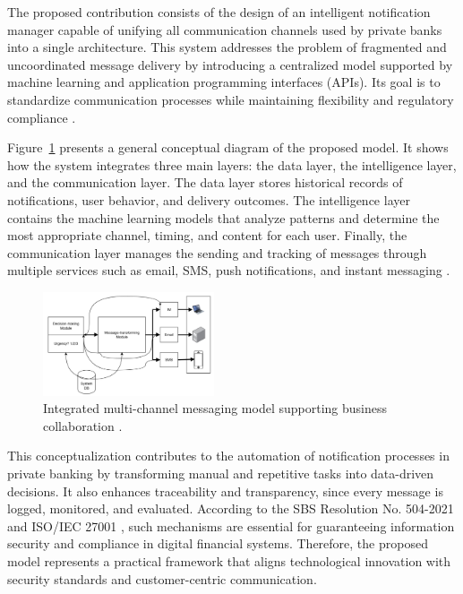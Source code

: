 \documentclass[conference]{IEEEtran}
\begin{document}
The proposed contribution consists of the design of an intelligent notification manager capable of unifying all communication channels used by private banks into a single architecture. This system addresses the problem of fragmented and uncoordinated message delivery by introducing a centralized model supported by machine learning and application programming interfaces (APIs). Its goal is to standardize communication processes while maintaining flexibility and regulatory compliance \cite{rahimi2021,torres2020}.

Figure~\ref{fig:liu2011} presents a general conceptual diagram of the proposed model. It shows how the system integrates three main layers: the data layer, the intelligence layer, and the communication layer. The data layer stores historical records of notifications, user behavior, and delivery outcomes. The intelligence layer contains the machine learning models that analyze patterns and determine the most appropriate channel, timing, and content for each user. Finally, the communication layer manages the sending and tracking of messages through multiple services such as email, SMS, push notifications, and instant messaging \cite{liang2011}.

\begin{figure}[htbp]
  \centering
  \includegraphics[width=0.45\textwidth]{liu2011-model.jpg}
  \caption{Integrated multi-channel messaging model supporting business collaboration \cite{liu2011}.}
  \label{fig:liu2011}
\end{figure}

This conceptualization contributes to the automation of notification processes in private banking by transforming manual and repetitive tasks into data-driven decisions. It also enhances traceability and transparency, since every message is logged, monitored, and evaluated. According to the SBS Resolution No. 504-2021 \cite{sbs2021} and ISO/IEC 27001 \cite{iso27001}, such mechanisms are essential for guaranteeing information security and compliance in digital financial systems. Therefore, the proposed model represents a practical framework that aligns technological innovation with security standards and customer-centric communication.




\end{document}
